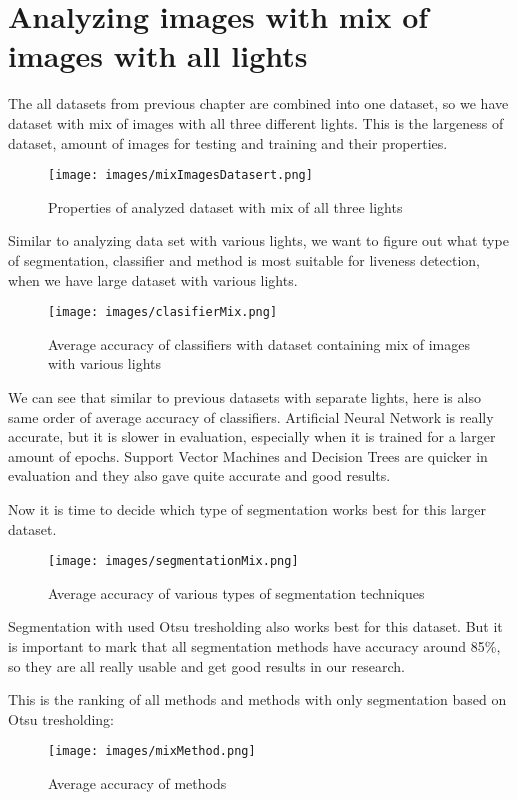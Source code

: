 \documentclass{article}
\begin{document}
\section{Analyzing images with mix of images with all lights}
The all datasets from previous chapter are combined into one dataset, so we have dataset with mix of images with all three different lights. This is the largeness of dataset, amount of images for testing and training and their properties.

\begin{figure}[!htbp]
    \centering
    \texttt{[image: images/mixImagesDatasert.png]}
    \caption{Properties of analyzed dataset with mix of all three lights}
\end{figure}

Similar to analyzing data set with various lights, we want to figure out what type of segmentation, classifier and method is most suitable for liveness detection, when we have large dataset with various lights.

\begin{figure}[!htbp]
    \centering
    \texttt{[image: images/clasifierMix.png]}
    \caption{Average accuracy of classifiers with dataset containing mix of images with various lights}
\end{figure}

We can see that similar to previous datasets with separate lights, here is also same order of average accuracy of classifiers. Artificial Neural Network is really accurate, but it is slower in evaluation, especially when it is trained for a larger amount of epochs. Support Vector Machines and Decision Trees are quicker in evaluation and they also gave quite accurate and good results.

Now it is time to decide which type of segmentation works best for this larger dataset.

\begin{figure}[!htbp]
    \centering
    \texttt{[image: images/segmentationMix.png]}
    \caption{Average accuracy of various types of segmentation techniques}
\end{figure}

Segmentation with used Otsu tresholding also works best for this dataset. But it is important to mark that all segmentation methods have accuracy around 85\%, so they are all really usable and get good results in our research.

This is the ranking of all methods and methods with only segmentation based on Otsu tresholding:
\begin{figure}[!htbp]
    \centering
    \texttt{[image: images/mixMethod.png]}
    \caption{Average accuracy of methods}
\end{figure}
\end{document}
